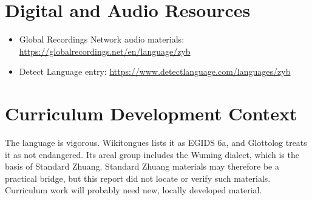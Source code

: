 \documentclass[12pt]{article}
\begin{document}
\section{Digital and Audio Resources}
\begin{itemize}
\item Global Recordings Network audio materials: \url{https://globalrecordings.net/en/language/zyb}
\item Detect Language entry: \url{https://www.detectlanguage.com/languages/zyb}
\end{itemize}

\section{Curriculum Development Context}
The language is vigorous. Wikitongues lists it as EGIDS 6a, and Glottolog treats it as not endangered. Its areal group includes the Wuming dialect, which is the basis of Standard Zhuang. Standard Zhuang materials may therefore be a practical bridge, but this report did not locate or verify such materials. Curriculum work will probably need new, locally developed material.
\end{document}
